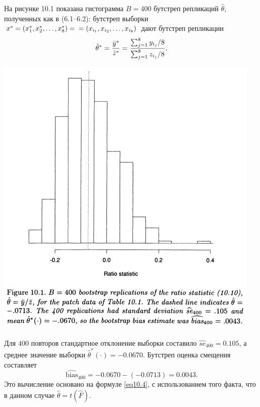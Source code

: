 На рисунке 10.1 показана гистограмма $B = 400$ бутстреп репликаций $\hat{\theta}$, полученных как в (6.1--6.2): бутстреп выборки $x^{*} = (x_{1}^{*}, x_{2}^{*}, \dots, x_{8}^{*}) =\\=(x_{i_1}, x_{i_2}, \dots, x_{i_8})$ дают бутстреп репликации
\begin{equation}\label{eq10.12}
   \hat{\theta}^{*} = \frac{\Bar{y}^{*}}{\Bar{z}^{*}} = \frac{\sum_{j=1}^{8}y_{i_j}/8}{\sum_{j=1}^{8}z_{i_j}/8}.
\end{equation}

\noindent
\includegraphics[width=\linewidth]{10/f10.1.png}
\newline

Для $400$ повторов стандартное отклонение выборки составило $\widehat{se}_{400} = 0.105$, а среднее значение выборки $\hat{\theta}^{*}(\cdot) = -0.0670$. Бутстреп оценка смещения составляет
\begin{equation}\label{eq10.12}
   \widehat{\text{bias}}_{400} = -0.0670 - (-0.0713) = 0.0043.
\end{equation}
Это вычисление основано на формуле \ref{eq10.4}, с использованием того факта, что в данном случае $\hat{\theta} = t(\hat{F})$.

